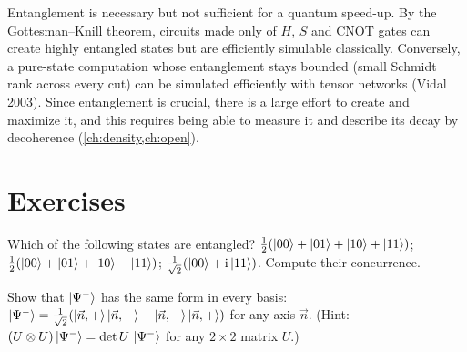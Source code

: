 \begin{remark}
Entanglement is necessary but not sufficient for a quantum speed-up. By the Gottesman--Knill theorem, circuits made only of $H$, $S$ and CNOT gates can
create highly entangled states but are efficiently simulable classically. Conversely, a pure-state computation whose entanglement stays bounded (small Schmidt rank
across every cut) can be simulated efficiently with tensor networks (Vidal 2003). Since entanglement is crucial, there is a large effort to create and maximize it,
and this requires being able to measure it and describe its decay by decoherence (\cref{ch:density,ch:open}).
\end{remark}

\section{Exercises}
\begin{exercise}
Which of the following states are entangled? $\frac12(\left|00\right\rangle+\left|01\right\rangle+\left|10\right\rangle+\left|11\right\rangle)$; $\frac12(\left|00\right\rangle+\left|01\right\rangle+\left|10\right\rangle-\left|11\right\rangle)$;
$\frac1{\sqrt2}(\left|00\right\rangle+\mathrm i\left|11\right\rangle)$. Compute their concurrence.
\end{exercise}
\begin{exercise}
Show that $\left|\Psi^-\right\rangle$ has the same form in every basis: $\left|\Psi^-\right\rangle=\frac1{\sqrt2}(\left|\vec n,+\right\rangle\left|\vec n,-\right\rangle-\left|\vec n,-\right\rangle\left|\vec n,+\right\rangle)$ for any axis $\vec n$.
(Hint: $(U\otimes U)\left|\Psi^-\right\rangle=\det U\,\left|\Psi^-\right\rangle$ for any $2\times2$ matrix $U$.)
\end{exercise}
